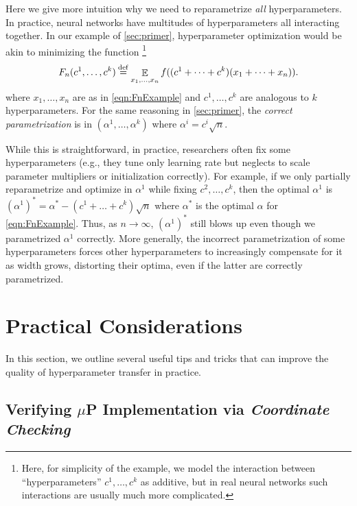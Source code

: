 \documentclass{article}
\theoremstyle{definition}
\DeclareMathOperator*{\EV}{\mathbb{E}}
\begin{document}
Here we give more intuition why we need to reparametrize \emph{all} hyperparameters.
In practice, neural networks have multitudes of hyperparameters all interacting together.
In our example of \cref{sec:primer}, hyperparameter optimization would be akin to minimizing the function
\footnote{
Here, for simplicity of the example, we model the interaction between ``hyperparameters'' $c^1, \ldots, c^k$ as additive, but in real neural networks such interactions are usually much more complicated.
}
\[
F_{n}(c^1, \ldots, c^k)\defeq\EV_{x_{1},\ldots,x_{n}}f((c^1 + \cdots + c^k)(x_{1}+\cdots+x_{n})).
\]
where $x_1, \ldots, x_n$ are as in \cref{eqn:FnExample} and $c^1, \ldots, c^k$ are analogous to $k$ hyperparameters.
For the same reasoning in \cref{sec:primer}, the \emph{correct parametrization} is in $(\alpha^1, \ldots, \alpha^k)$ where $\alpha^i = c^i \sqrt{n}$.

While this is straightforward, in practice, researchers often fix some hyperparameters (e.g., they tune only learning rate but neglects to scale parameter multipliers or initialization correctly).
For example, if we only partially reparametrize and optimize in $\alpha^1$ while fixing $c^2, \ldots, c^k$, then the optimal $\alpha^1$ is $(\alpha^1)^* = \alpha^* - (c^1 + \ldots + c^k) \sqrt n$ where $\alpha^*$ is the optimal $\alpha$ for \cref{eqn:FnExample}.
Thus, as $n \to \infty$, $(\alpha^1)^*$ still blows up even though we parametrized $\alpha^1$ correctly.
More generally, the incorrect parametrization of some hyperparameters forces other hyperparameters to increasingly compensate for it as width grows, distorting their optima, even if the latter are correctly parametrized.

\section{Practical Considerations}
\label{sec:practical}

In this section, we outline several useful tips and tricks that can improve the quality of hyperparameter transfer in practice.

\subsection{Verifying \texorpdfstring{$\mu$P}{muP} Implementation via \emph{Coordinate Checking}}
\end{document}
